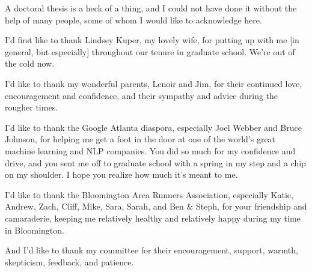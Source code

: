 
A doctoral thesis is a heck of a thing, and I could not have done it without
the help of many people, some of whom I would like to acknowledge here.

I'd first like to thank Lindsey Kuper, my lovely wife, for putting up with me
[in general, but especially]
throughout our tenure in graduate school. We're out of the cold now.

I'd like to thank my wonderful parents, Lenoir and Jim, for their continued
love, encouragement and confidence, and their sympathy and advice during the
rougher times.

I'd like to thank the Google Atlanta diaspora, especially Joel Webber and Bruce
Johnson, for helping me get a foot in the door at one of the world's great
machine learning and NLP companies. You did so much for my confidence and
drive, and you sent me off to graduate school with a spring in my step and a
chip on my shoulder. I hope you realize how much it's meant to me.

I'd like to thank the Bloomington Area Runners Association, especially Katie,
Andrew, Zach, Cliff, Mike, Sara, Sarah, and Ben \& Steph, for your friendship
and camaraderie, keeping me relatively healthy and relatively happy during my
time in Bloomington.

And I'd like to thank my committee for their encouragement, support, warmth,
skepticism, feedback, and patience.

